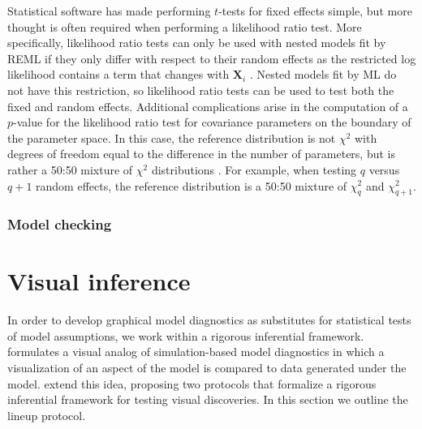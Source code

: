 \documentclass{article} %
\begin{document}
Statistical software has made performing $t$-tests for fixed effects simple, but more thought is often required when performing a likelihood ratio test. More specifically, likelihood ratio tests can only be used with nested models fit by REML if they only differ with respect to their random effects  as the restricted log likelihood contains a term that changes with $\bm{X}_i$ \citep[c.f.,][Section 2.2.5]{Pinhiero:2000vf}. Nested models fit by ML do not have this restriction, so likelihood ratio tests can be used to test both the fixed and random effects. Additional complications arise in the computation of a $p$-value for the likelihood ratio test for covariance parameters on the boundary of the parameter space. In this case, the reference distribution is not $\chi^2$ with degrees of freedom equal to the difference in the number of parameters, but is rather a 50:50 mixture of $\chi^2$ distributions \citep{Self:1987wb, Stram:1994wd}. For example, when testing $q$ versus $q + 1$ random effects, the reference distribution is a 50:50 mixture of $\chi^2_q$ and $\chi^2_{q+1}$.

\subsubsection{Model checking}


\section{Visual inference}\label{sec:vi}
In order to develop graphical model diagnostics as substitutes for statistical tests of model assumptions, we work within a rigorous inferential framework. \cite{Gelman:2004gg} formulates a visual analog of simulation-based model diagnostics in which a visualization of an aspect of the model is compared to data generated under the model. \cite{Buja:2009hp} extend this idea, proposing two protocols that formalize a rigorous inferential framework for testing visual discoveries. In this section we outline the lineup protocol.
\end{document}
